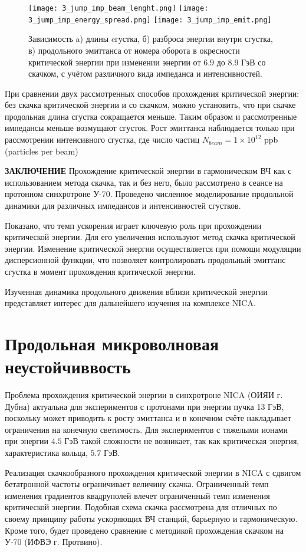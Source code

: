 \begin{figure}
   \texttt{[image: 3\_jump\_imp\_beam\_lenght.png]}
   \texttt{[image: 3\_jump\_imp\_energy\_spread.png]}
   \texttt{[image: 3\_jump\_imp\_emit.png]}
   \caption{Зависимость a) длины cгустка, б) разброса энергии внутри сгустка, в) продольного эмиттанса от номера оборота в окресности критической энергии при изменении энергии от $6.9$ до $8.9$ ГэВ со скачком, с учётом различного вида импеданса и интенсивностей.}
   \label{fig:3_jump_imp}
\end{figure}

\par При сравнении двух рассмотренных способов прохождения критической энергии: без скачка критической энергии и со скачком, можно установить, что при скачке продольная длина сгустка сокращается меньше. Таким образом и рассмотренные импедансы меньше возмущают сгусток. Рост эмиттанса наблюдается только при рассмотрении интенсивного сгустка, где число частиц $N_{beam}=1\times{10}^{12}$ ppb (particles per beam)

\textbf{ЗАКЛЮЧЕНИЕ}
Прохождение критической энергии в гармоническом ВЧ как с использованием метода скачка, так и без него, было рассмотрено в сеансе на протонном синхротроне У-70. Проведено численное моделирование продольной динамики для различных импедансов и интенсивностей сгустков.

\par Показано, что темп ускорения играет ключевую роль при прохождении критической энергии. Для его увеличения используют метод скачка критической энергии. Изменение критической энергии осуществляется при помощи модуляции дисперсионной функции, что позволяет контролировать продольный эмиттанс сгустка в момент прохождения критической энергии.
\par Изученная динамика продольного движения вблизи критической энергии представляет интерес для дальнейшего изучения на комплексе NICA.

\section{Продольная микроволновая неустойчиввость}\label{sec:transition_jump/microwave_instab}

\par Проблема прохождения критической энергии в синхротроне NICA (ОИЯИ г. Дубна) актуальна для экспериментов с протонами при энергии пучка 13 ГэВ, поскольку может приводить к росту эмиттанса и в конечном счёте накладывает ограничения на конечную светимость. Для экспериментов с тяжелыми ионами при энергии $4.5$ ГэВ такой сложности не возникает, так как критическая энергия, характеристика кольца, $5.7$ ГэВ. 
\par Реализация скачкообразного прохождения критической энергии в NICA с сдвигом бетатронной частоты ограничивает величину скачка. Ограниченный темп изменения градиентов квадруполей влечет ограниченный темп изменения критической энергии. Подобная схема скачка рассмотрена для отличных по своему принципу работы ускоряющих ВЧ станций, барьерную и гармоническую. Кроме того, будет проведено сравнение с методикой прохождения скачком на У-70 (ИФВЭ г. Протвино).

